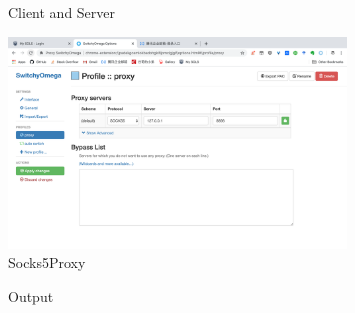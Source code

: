 \documentclass[11pt]{article}
\begin{document}
\begin{figure}[H]
    \centering
    \caption{Client and Server}
\end{figure}
\begin{figure}[H]
    \centering
    \includegraphics[width=0.8\textwidth]{s5}
    \caption{Socks5Proxy}
\end{figure}
\begin{figure}[H]
    \centering
    \caption{Output}
\end{figure}
\end{document}
